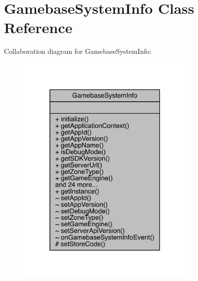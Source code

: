 \hypertarget{classcom_1_1toast_1_1android_1_1gamebase_1_1_gamebase_system_info}{}\section{Gamebase\+System\+Info Class Reference}
\label{classcom_1_1toast_1_1android_1_1gamebase_1_1_gamebase_system_info}


Collaboration diagram for Gamebase\+System\+Info\+:
\nopagebreak
\begin{figure}[H]
\begin{center}
\leavevmode
\includegraphics[width=247pt]{classcom_1_1toast_1_1android_1_1gamebase_1_1_gamebase_system_info__coll__graph}
\end{center}
\end{figure}
